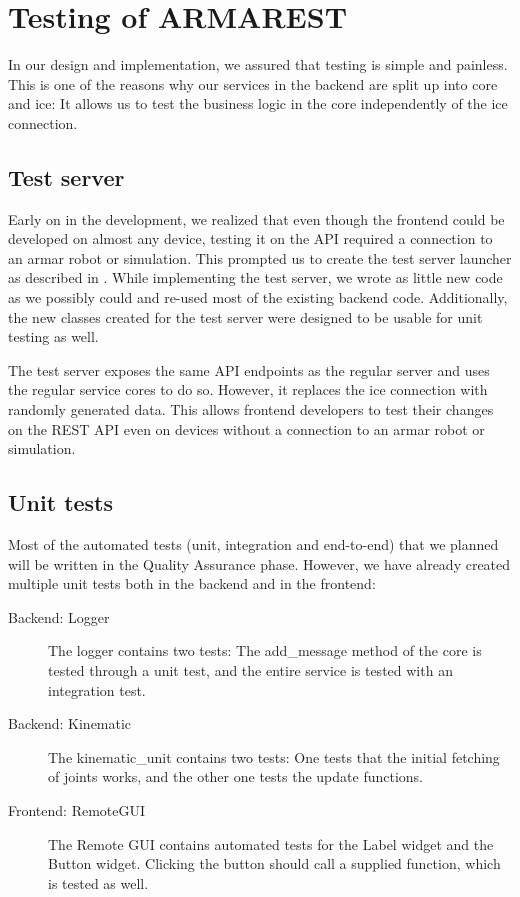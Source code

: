 
\chapter{Testing of ARMAREST}

In our design and implementation, we assured that testing is simple and painless.
This is one of the reasons why our services in the \gls{backend} are split up into core and ice: 
It allows us to test the business logic in the core independently of the \gls{ice} connection.

\section{Test server}

Early on in the development, we realized that even though the \gls{frontend} could be developed on almost any device, 
testing it on the API required a connection to an \gls{armar} robot or simulation.
This prompted us to create the test server launcher as described in .
While implementing the test server, we wrote as little new code as we possibly could and re-used most of the existing \gls{backend} code.
Additionally, the new classes created for the test server were designed to be usable for unit testing as well.

The test server exposes the same API endpoints as the regular server and uses the regular service cores to do so.
However, it replaces the \gls{ice} connection with randomly generated data.
This allows \gls{frontend} developers to test their changes on the REST API even on devices without a connection to an \gls{armar} robot or simulation.

\section{Unit tests}

Most of the automated tests (unit, integration and end-to-end) that we planned will be written in the Quality Assurance phase.
However, we have already created multiple unit tests both in the \gls{backend} and in the \gls{frontend}:

\begin{description}
    \item[Backend: Logger] The logger contains two tests: The add\_message method of the core is tested through a unit test, and the entire service is tested with an integration test.
    \item[Backend: Kinematic] The kinematic\_unit contains two tests: One tests that the initial fetching of joints works, and the other one tests the update functions.
    \item[Frontend: RemoteGUI] The Remote GUI contains automated tests for the Label widget and the Button widget. Clicking the button should call a supplied function, which is tested as well.
\end{description}


